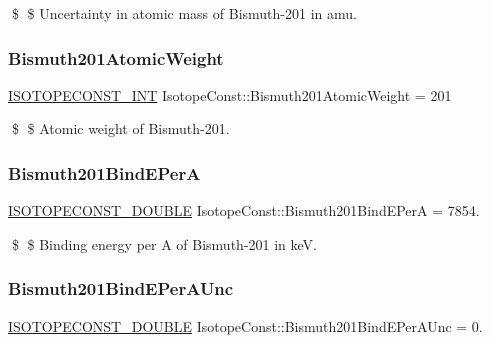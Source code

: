 \$ \$ Uncertainty in atomic mass of Bismuth-\/201 in amu. \mbox{\label{group___isotope_const-_bismuth-_bi201_gaa75a242c798cd4907c955d75997a11be}} 
\subsubsection{\texorpdfstring{Bismuth201\+Atomic\+Weight}{Bismuth201AtomicWeight}}
{\footnotesize\ttfamily \mbox{\hyperlink{group___isotope_const-_macros_ga5f18360b3e99483a35c32d789e62621c}{I\+S\+O\+T\+O\+P\+E\+C\+O\+N\+S\+T\+\_\+\+I\+NT}} Isotope\+Const\+::\+Bismuth201\+Atomic\+Weight = 201}

\$ \$ Atomic weight of Bismuth-\/201. \mbox{\label{group___isotope_const-_bismuth-_bi201_gaad6e0513a42748433be45f39c65b02ad}} 
\subsubsection{\texorpdfstring{Bismuth201\+Bind\+E\+PerA}{Bismuth201BindEPerA}}
{\footnotesize\ttfamily \mbox{\hyperlink{group___isotope_const-_macros_ga8f45a7272ce02c0b4c65c44636ed719a}{I\+S\+O\+T\+O\+P\+E\+C\+O\+N\+S\+T\+\_\+\+D\+O\+U\+B\+LE}} Isotope\+Const\+::\+Bismuth201\+Bind\+E\+PerA = 7854.}

\$ \$ Binding energy per A of Bismuth-\/201 in keV. \mbox{\label{group___isotope_const-_bismuth-_bi201_ga219e008c6f756d74264f4da3d293321c}} 
\subsubsection{\texorpdfstring{Bismuth201\+Bind\+E\+Per\+A\+Unc}{Bismuth201BindEPerAUnc}}
{\footnotesize\ttfamily \mbox{\hyperlink{group___isotope_const-_macros_ga8f45a7272ce02c0b4c65c44636ed719a}{I\+S\+O\+T\+O\+P\+E\+C\+O\+N\+S\+T\+\_\+\+D\+O\+U\+B\+LE}} Isotope\+Const\+::\+Bismuth201\+Bind\+E\+Per\+A\+Unc = 0.}

